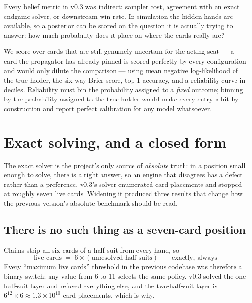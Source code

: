 \documentclass[11pt,a4paper]{article}
\begin{document}
Every belief metric in v0.3 was indirect: sampler cost, agreement with an exact
endgame solver, or downstream win rate. In simulation the hidden hands are
available, so a posterior can be scored on the question it is actually trying
to answer: how much probability does it place on where the cards really are?

We score over cards that are still genuinely uncertain for the acting seat --- a
card the propagator has already pinned is scored perfectly by every
configuration and would only dilute the comparison --- using mean negative
log-likelihood of the true holder, the six-way Brier score, top-1 accuracy, and
a reliability curve in deciles. Reliability must bin the probability assigned
to a \emph{fixed} outcome; binning by the probability assigned to the true
holder would make every entry a hit by construction and report perfect
calibration for any model whatsoever.

\section{Exact solving, and a closed form}
\label{sec:exact}

The exact solver is the project's only source of \emph{absolute} truth: in a
position small enough to solve, there is a right answer, so an engine that
disagrees has a defect rather than a preference. v0.3's solver enumerated card
placements and stopped at roughly seven live cards. Widening it produced three
results that change how the previous version's absolute benchmark should be
read.

\subsection{There is no such thing as a seven-card position}

Claims strip all six cards of a half-suit from every hand, so
\begin{equation}
\text{live cards} \;=\; 6 \times (\text{unresolved half-suits}) \qquad
\text{exactly, always.}
\end{equation}
Every ``maximum live cards'' threshold in the previous codebase was therefore a
binary switch: any value from 6 to 11 selects the same policy. v0.3 solved the
one-half-suit layer and refused everything else, and the two-half-suit layer is
$6^{12}\times 6 \approx 1.3\times10^{10}$ card placements, which is why.
\end{document}
